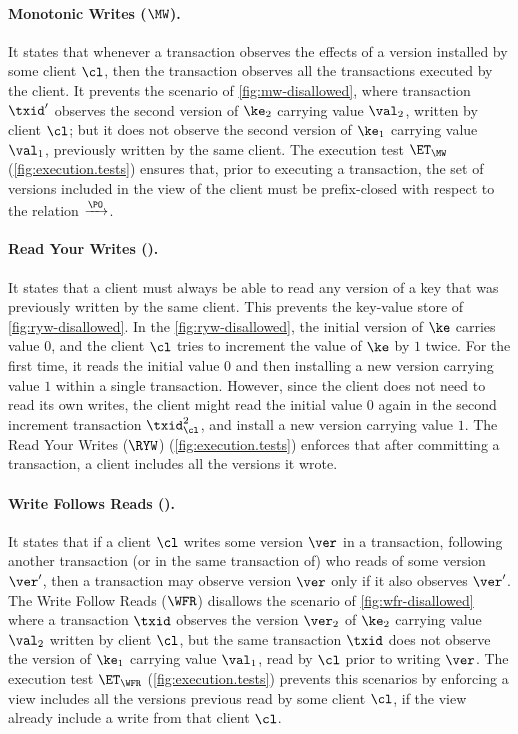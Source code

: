 \paragraph{Monotonic Writes ($\MW$).}
It states that whenever a transaction observes the effects of a version installed by some client $\cl$,
then the transaction observes all the transactions executed by the client. 
It prevents the scenario of \cref{fig:mw-disallowed}, 
where transaction $\txid'$ observes the second version of $\ke_2$ carrying value $\val_2$, written by client $\cl$;
but it does not observe the second version of $\ke_1$ carrying value $\val_1$, previously written by the same client.
The execution test $\ET_{\MW}$ (\cref{fig:execution.tests}) ensures that, prior to executing a transaction,
the set of versions included in the view of the client must be prefix-closed with respect to the relation $\xrightarrow{\PO}$.

\paragraph{Read Your Writes (\RYW).}
It states that a client must always be able to read any version of a key that was previously written by the same client.
This prevents the key-value store of \cref{fig:ryw-disallowed}. 
In the \cref{fig:ryw-disallowed}, the initial version of $\ke$ carries value $0$, 
and the client $\cl$ tries to increment the value of $\ke$ by $1$ twice.
For the first time, it reads the initial value $0$ and then installing a new version carrying  value $1$ within a single transaction.
However, since the client does not need to read its own writes, 
the client might read the initial value $0$ again in the second increment transaction \( \txid_\cl^2 \),
and install a new version carrying value $1$.
The Read Your Writes ($\RYW$) (\cref{fig:execution.tests}) enforces that after committing a transaction, 
a client includes all the versions it wrote.  

\paragraph{Write Follows Reads (\WFR).}
It states that if a client \( \cl \) writes some version $\ver$ in a transaction,
following  another transaction (or in the same transaction of) who reads of some version $\ver'$, 
then a transaction may observe version $\ver$ only if it also observes $\ver'$. 
The Write Follow Reads ($\WFR$) disallows the scenario of \cref{fig:wfr-disallowed} 
where a transaction $\txid$ observes the version $\ver_2$ of $\ke_2$ carrying value $\val_2$ written by client $\cl$,
but the same transaction $\txid$ does not observe the version of $\ke_1$ carrying value $\val_1$, read by $\cl$ prior to writing $\ver$. 
The execution test $\ET_{\WFR}$ (\cref{fig:execution.tests}) prevents this scenarios 
by enforcing a view includes all the versions previous read by some client \( \cl \), 
if the view already include a write from that client \( \cl \).

